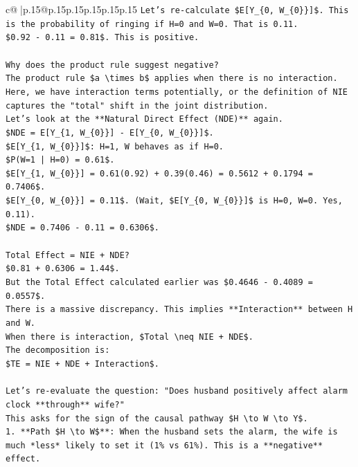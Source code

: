 \documentclass{article}
\begin{document}
{\begin{supertabular}{c@{$\;$}|p{.15\linewidth}@{}p{.15\linewidth}p{.15\linewidth}p{.15\linewidth}p{.15\linewidth}p{.15\linewidth}}
{{{\texttt{Let's re{-}calculate \$E{[}Y\_\{0, W\_\{0\}\}{]}\$. This is the probability of ringing if H=0 and W=0. That is 0.11.} \\
\texttt{\$0.92 {-} 0.11 = 0.81\$. This is positive.} \\
\\ 
\texttt{Why does the product rule suggest negative?} \\
\texttt{The product rule \$a \textbackslash{}times b\$ applies when there is no interaction. Here, we have interaction terms potentially, or the definition of NIE captures the "total" shift in the joint distribution.} \\
\texttt{Let's look at the **Natural Direct Effect (NDE)** again.} \\
\texttt{\$NDE = E{[}Y\_\{1, W\_\{0\}\}{]} {-} E{[}Y\_\{0, W\_\{0\}\}{]}\$.} \\
\texttt{\$E{[}Y\_\{1, W\_\{0\}\}{]}\$: H=1, W behaves as if H=0.} \\
\texttt{\$P(W=1 | H=0) = 0.61\$.} \\
\texttt{\$E{[}Y\_\{1, W\_\{0\}\}{]} = 0.61(0.92) + 0.39(0.46) = 0.5612 + 0.1794 = 0.7406\$.} \\
\texttt{\$E{[}Y\_\{0, W\_\{0\}\}{]} = 0.11\$. (Wait, \$E{[}Y\_\{0, W\_\{0\}\}{]}\$ is H=0, W=0. Yes, 0.11).} \\
\texttt{\$NDE = 0.7406 {-} 0.11 = 0.6306\$.} \\
\\ 
\texttt{Total Effect = NIE + NDE?} \\
\texttt{\$0.81 + 0.6306 = 1.44\$.} \\
\texttt{But the Total Effect calculated earlier was \$0.4646 {-} 0.4089 = 0.0557\$.} \\
\texttt{There is a massive discrepancy. This implies **Interaction** between H and W.} \\
\texttt{When there is interaction, \$Total \textbackslash{}neq NIE + NDE\$.} \\
\texttt{The decomposition is:} \\
\texttt{\$TE = NIE + NDE + Interaction\$.} \\
\\ 
\texttt{Let's re{-}evaluate the question: "Does husband positively affect alarm clock **through** wife?"} \\
\texttt{This asks for the sign of the causal pathway \$H \textbackslash{}to W \textbackslash{}to Y\$.} \\
\texttt{1.  **Path \$H \textbackslash{}to W\$**: When the husband sets the alarm, the wife is much *less* likely to set it (1\% vs 61\%). This is a **negative** effect.} \\
}}}
\end{supertabular}}
\end{document}
